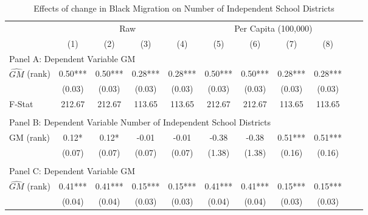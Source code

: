  \begin{table}[htbp]\centering {} \begin{threeparttable} \caption{Effects of change in Black Migration on Number of Independent School Districts} \begin{tabular}{l*{10}{c}} \toprule
                &\multicolumn{4}{c}{Raw}                                    &\multicolumn{4}{c}{Per Capita (100,000)}                   \\\cmidrule(lr){2-5}\cmidrule(lr){6-9}
                &\multicolumn{1}{c}{(1)}   &\multicolumn{1}{c}{(2)}   &\multicolumn{1}{c}{(3)}   &\multicolumn{1}{c}{(4)}   &\multicolumn{1}{c}{(5)}   &\multicolumn{1}{c}{(6)}   &\multicolumn{1}{c}{(7)}   &\multicolumn{1}{c}{(8)}   \\
\cmidrule(lr){1-9}
\multicolumn{8}{l}{Panel A: Dependent Variable GM}\\
\cmidrule(lr){1-9}
$\hat{GM}$ (rank)&       0.50***&       0.50***&       0.28***&       0.28***&       0.50***&       0.50***&       0.28***&       0.28***\\
                &     (0.03)   &     (0.03)   &     (0.03)   &     (0.03)   &     (0.03)   &     (0.03)   &     (0.03)   &     (0.03)   \\
\midrule
F-Stat          &     212.67   &     212.67   &     113.65   &     113.65   &     212.67   &     212.67   &     113.65   &     113.65   \\
\cmidrule[\heavyrulewidth](lr){1-9} \\ \cmidrule[\heavyrulewidth](lr){1-9}
\multicolumn{8}{l}{Panel B: Dependent Variable Number of Independent School Districts}\\
\cmidrule(lr){1-9}
GM  (rank)      &       0.12*  &       0.12*  &      -0.01   &      -0.01   &      -0.38   &      -0.38   &       0.51***&       0.51***\\
                &     (0.07)   &     (0.07)   &     (0.07)   &     (0.07)   &     (1.38)   &     (1.38)   &     (0.16)   &     (0.16)   \\
\cmidrule[\heavyrulewidth](lr){1-9} \\ \cmidrule[\heavyrulewidth](lr){1-9}
\multicolumn{8}{l}{Panel C: Dependent Variable GM}\\
\cmidrule(lr){1-9}
$\hat{GM}$ (rank)&       0.41***&       0.41***&       0.15***&       0.15***&       0.41***&       0.41***&       0.15***&       0.15***\\
                &     (0.04)   &     (0.04)   &     (0.03)   &     (0.03)   &     (0.04)   &     (0.04)   &     (0.03)   &     (0.03)   \\

\end{tabular}
\end{threeparttable}
\end{table}
